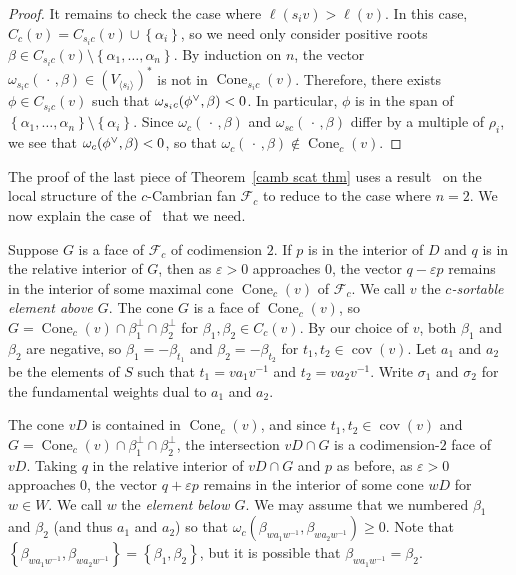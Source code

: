 \documentclass[ALCO,ThmDefs,Unicode,epreuves]{cedram}
\DeclareMathOperator{\cov}{cov}
\DeclareMathOperator{\Cone}{Cone}
\newcommand{\newword}[1]{\emph{#1}}
\newcommand{\ep}{\varepsilon}
\newcommand{\set}[1]{{\left\lbrace #1 \right\rbrace}}
\newcommand{\br}[1]{{\langle #1 \rangle}}
\newcommand{\F}{{\mathcal F}}
\newcommand{\ck}{\spcheck}
\begin{document}
\begin{proof}
It remains to check the case where $\ell(s_iv)>\ell(v)$.
In this case, $C_c(v)=C_{s_ic}(v)\cup\set{\alpha_i}$, so we need only consider positive roots $\beta\in C_{s_ic}(v)\setminus\set{\alpha_1,\ldots,\alpha_n}$.
By induction on $n$, the vector $\omega_{s_ic}(\,\cdot\,,\beta)\in(V_\br{s_i})^*$ is not in $\Cone_{s_ic}(v)$.
Therefore, there exists $\phi\in C_{s_ic}(v)$ such that $\omega_{s_ic}(\phi\ck,\beta)<0$.
In particular, $\phi$ is in the span of $\set{\alpha_1,\ldots,\alpha_n}\setminus\set{\alpha_i}$.
Since $\omega_c(\,\cdot\,,\beta)$ and $\omega_{sc}(\,\cdot\,,\beta)$ differ by a multiple of $\rho_i$, we see that $\omega_{c}(\phi\ck,\beta)<0$, so that $\omega_c(\,\cdot\,,\beta)\not\in\Cone_c(v)$.
\end{proof}

The proof of the last piece of Theorem~\ref{camb scat thm} uses a result~\cite[Theorem~9.8]{typefree} on the local structure of the $c$-Cambrian fan $\F_c$ to reduce to the case where $n=2$.
We now explain the case of~\cite[Theorem~9.8]{typefree} that we need.

Suppose $G$ is a face of $\F_c$ of codimension $2$.
If $p$ is in the interior of $D$ and $q$ is in the relative interior of $G$, then as $\ep>0$ approaches $0$, the vector $q-\ep p$ remains in the interior of some maximal cone $\Cone_c(v)$ of $\F_c$.
We call $v$ the \newword{$c$-sortable element above $G$}.
The cone $G$ is a face of $\Cone_c(v)$, so $G=\Cone_c(v)\cap\beta_1^\perp\cap\beta_2^\perp$ for $\beta_1,\beta_2\in C_c(v)$.
By our choice of $v$, both $\beta_1$ and $\beta_2$ are negative, so $\beta_1=-\beta_{t_1}$ and $\beta_2=-\beta_{t_2}$ for $t_1,t_2\in\cov(v)$.
Let $a_1$ and $a_2$ be the elements of $S$ such that $t_1=va_1v^{-1}$ and $t_2=va_2v^{-1}$.
Write $\sigma_1$ and $\sigma_2$ for the fundamental weights dual to $a_1$ and $a_2$.

The cone $vD$ is contained in $\Cone_c(v)$, and since $t_1,t_2\in\cov(v)$ and $G=\Cone_c(v)\cap\beta_1^\perp\cap\beta_2^\perp$, the intersection $vD\cap G$ is a codimension-$2$ face of $vD$.
Taking $q$ in the relative interior of $vD\cap G$ and $p$ as before, as $\ep>0$ approaches $0$, the vector $q+\ep p$ remains in the interior of some cone $wD$ for $w\in W$.
We call $w$ the \newword{element below $G$}.
We may assume that we numbered $\beta_1$ and $\beta_2$ (and thus $a_1$ and $a_2$) so that $\omega_c(\beta_{wa_1w^{-1}},\beta_{wa_2w^{-1}})\ge0$.
Note that $\set{\beta_{wa_1w^{-1}},\beta_{wa_2w^{-1}}}=\set{\beta_1,\beta_2}$, but it is possible that $\beta_{wa_1w^{-1}}=\beta_2$.
\end{document}
